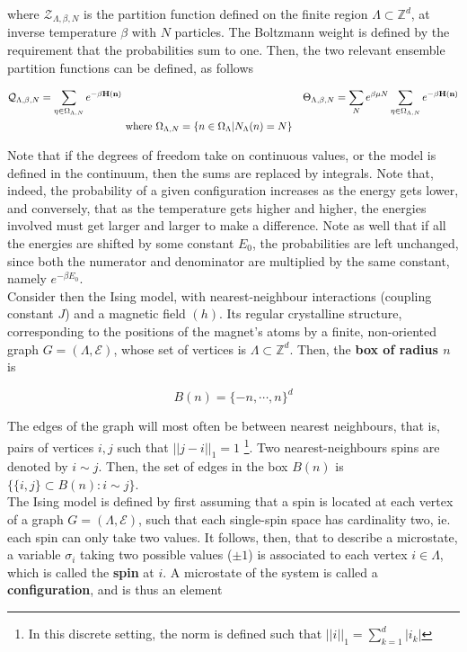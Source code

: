 \documentclass{homework}
\begin{document}
where $\mathcal{Z}_{\Lambda, \beta, N}$ is the partition function defined on the finite region $\Lambda \subset \mathds{Z}^d$, at inverse temperature $\beta$ with $N$ particles. The Boltzmann weight is defined by the requirement that the probabilities sum to one. Then, the two relevant ensemble partition functions can be defined, as follows

\begin{align*}
        \mathcal{Q}_{\Lambda, \beta, N} = \sum_{\eta \in \Omega_{\Lambda, N}} e^{-\beta {\bf H}({\bf n})} & \textnormal{ } & 
        \Theta_{\Lambda, \beta, N} = \sum_{N} e^{\beta \mu N} \sum_{\eta \in \Omega_{\Lambda, N}} e^{-\beta {\bf H}({\bf n})} \\
        \textnormal{ } & \textnormal{ where } \Omega_{\Lambda, N} = \{n \in \Omega_{\Lambda} | N_{\Lambda} (n) = N\} & \textnormal{ }
\end{align*}


Note that if the degrees of freedom take on continuous values, or the model is defined in the continuum, then the sums are replaced by integrals. Note that, indeed, the probability of a given configuration increases as the energy gets lower, and conversely, that as the temperature gets higher and higher, the energies involved must get larger and larger to make a difference. Note as well that if all the energies are shifted by some constant $E_0$, the probabilities are left unchanged, since both the numerator and denominator are multiplied by the same constant, namely $e^{-\beta E_0}$. \\


Consider then the Ising model, with nearest-neighbour interactions (coupling constant $J$) and a magnetic field $(h)$. Its regular crystalline structure, corresponding to the positions of the magnet's atoms by a finite, non-oriented graph $G = (\Lambda, \mathcal{E})$, whose set of vertices is $\Lambda \subset \mathds{Z}^d$. Then, the \textbf{box of radius $n$} is 

$$
    B({n}) = \{-n, \cdots, n\}^d
$$

The edges of the graph will most often be between nearest neighbours, that is, pairs of vertices $i, j$ such that $||j-i||_{1} = 1$ \footnote{In this discrete setting, the norm is defined such that $||i||_1 = \sum_{k=1}^d |i_k|$}. Two nearest-neighbours spins are denoted by $i \sim j$. Then, the set of edges in the box $B(n)$ is $\{\{i,j\} \subset B(n) : i \sim j\}$. \\

The Ising model is defined by first assuming that a spin is located at each vertex of a graph $G = (\Lambda, \mathcal{E})$, such that each single-spin space has cardinality two, ie. each spin can only take two values. It follows, then, that to describe a microstate, a variable $\sigma_i$ taking two possible values ($\pm1$) is associated to each vertex $i \in \Lambda$, which is called the \textbf{spin} at $i$. A microstate of the system is called a \textbf{configuration}, and is thus an element
\end{document}
